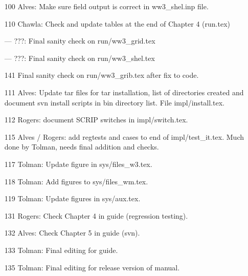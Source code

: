 \begin{itemize}
\item[100] Alves: Make sure field output is correct in ww3\_shel.inp file.

\item[110] Chawla: Check and update tables at the end of Chapter 4 (run.tex)

\item[---] ???: Final sanity check on run/ww3\_grid.tex

\item[---] ???: Final sanity check on run/ww3\_shel.tex

\item[141] Final sanity check on run/ww3\_grib.tex after fix to code.

\item[111] Alves: Update tar files for tar installation, list of directories
  created and document svn install scripts in bin directory list. File
  impl/install.tex. 

\item[112] Rogers: document SCRIP switches in impl/switch.tex.

\item[115] Alves / Rogers: add regtests and cases to end of
  impl/test\_it.tex. Much done by Tolman, needs final addition and checks. 

\item[117] Tolman: Update figure in sys/files\_w3.tex.

\item[118] Tolman: Add figures to sys/files\_wm.tex.

\item[119] Tolman: Update figures in sys/aux.tex.

\item [131] Rogers: Check Chapter 4 in guide (regression testing).

\item [132] Alves: Check Chapter 5 in guide (svn).

\item [133] Tolman: Final editing for guide. 

\item [135] Tolman: Final editing for release version of manual.

\end{itemize}

\bpage
\pagestyle{empty}
